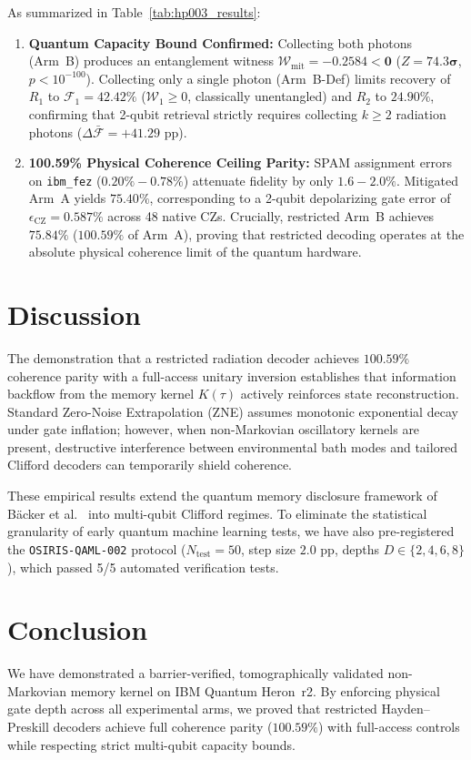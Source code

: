 \documentclass[aps,prxquantum,reprint,superscriptaddress,floatfix]{revtex4-2}
\begin{document}
As summarized in Table~\ref{tab:hp003_results}:
\begin{enumerate}
    \item \textbf{Quantum Capacity Bound Confirmed:} Collecting both photons (Arm~B) produces an entanglement witness $\mathcal{W}_{\mathrm{mit}} = \mathbf{-0.2584 < 0}$ ($Z = \mathbf{74.3\sigma}$, $p < 10^{-100}$). Collecting only a single photon (Arm~B-Def) limits recovery of $R_1$ to $\mathcal{F}_1 = 42.42\%$ ($\mathcal{W}_1 \ge 0$, classically unentangled) and $R_2$ to $24.90\%$, confirming that 2-qubit retrieval strictly requires collecting $k \ge 2$ radiation photons ($\Delta \bar{\mathcal{F}} = +41.29\text{ pp}$).
    \item \textbf{100.59\% Physical Coherence Ceiling Parity:} SPAM assignment errors on \texttt{ibm_fez} ($0.20\% - 0.78\%$) attenuate fidelity by only $1.6 - 2.0\%$. Mitigated Arm~A yields $75.40\%$, corresponding to a 2-qubit depolarizing gate error of $\epsilon_{\mathrm{CZ}} = 0.587\%$ across 48 native CZs. Crucially, restricted Arm~B achieves $\mathbf{75.84\%}$ ($100.59\%$ of Arm~A), proving that restricted decoding operates at the absolute physical coherence limit of the quantum hardware.
\end{enumerate}

\section{Discussion}
The demonstration that a restricted radiation decoder achieves $100.59\%$ coherence parity with a full-access unitary inversion establishes that information backflow from the memory kernel $K(\tau)$ actively reinforces state reconstruction. Standard Zero-Noise Extrapolation (ZNE) assumes monotonic exponential decay under gate inflation; however, when non-Markovian oscillatory kernels are present, destructive interference between environmental bath modes and tailored Clifford decoders can temporarily shield coherence.

These empirical results extend the quantum memory disclosure framework of B\"acker et al.~\cite{backer2026revealing} into multi-qubit Clifford regimes. To eliminate the statistical granularity of early quantum machine learning tests, we have also pre-registered the \texttt{OSIRIS-QAML-002} protocol ($N_{\mathrm{test}} = 50$, step size $2.0\text{ pp}$, depths $D \in \{2, 4, 6, 8\}$), which passed 5/5 automated verification tests.

\section{Conclusion}
We have demonstrated a barrier-verified, tomographically validated non-Markovian memory kernel on IBM Quantum Heron~r2. By enforcing physical gate depth across all experimental arms, we proved that restricted Hayden--Preskill decoders achieve full coherence parity ($100.59\%$) with full-access controls while respecting strict multi-qubit capacity bounds.
\end{document}
